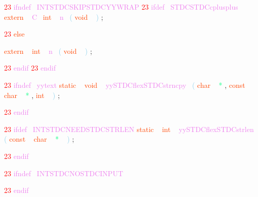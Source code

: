 \documentclass[8, usernames, dvipsnames]{beamer}
\begin{document}
\begin{frame}
 \textcolor{Red}{23}
\textcolor{Violet}{ifndef}\textcolor{White}{\ }
\textcolor{Violet}{INTSTDCSKIPSTDCYYWRAP}
  \textcolor{Red}{23}
\textcolor{Violet}{ifdef}\textcolor{White}{\ }
\textcolor{Violet}{STDCSTDCcplusplus}
 \textcolor{OrangeRed}{extern}
\textcolor{White}{\ }
\textcolor{Violet}{C}\textcolor{White}{\ }
\textcolor{OrangeRed}{int}
\textcolor{White}{\ }
\textcolor{Violet}{n}\textcolor{White}{\ }
\textcolor{SkyBlue}{(}
\textcolor{OrangeRed}{void}
\textcolor{White}{\ }
\textcolor{SkyBlue}{)}
\textcolor{Sepia}{;}

  \textcolor{Red}{23}
\textcolor{OrangeRed}{else}

 \textcolor{OrangeRed}{extern}
\textcolor{White}{\ }
\textcolor{OrangeRed}{int}
\textcolor{White}{\ }
\textcolor{Violet}{n}\textcolor{White}{\ }
\textcolor{SkyBlue}{(}
\textcolor{OrangeRed}{void}
\textcolor{White}{\ }
\textcolor{SkyBlue}{)}
\textcolor{Sepia}{;}

  \textcolor{Red}{23}
\textcolor{Violet}{endif}
  \textcolor{Red}{23}
\textcolor{Violet}{endif}
 
  \textcolor{Red}{23}
\textcolor{Violet}{ifndef}\textcolor{White}{\ }
\textcolor{Violet}{yytext}
 \textcolor{OrangeRed}{static}
\textcolor{White}{\ }
\textcolor{OrangeRed}{void}
\textcolor{White}{\ }
\textcolor{Violet}{yySTDCflexSTDCstrncpy}\textcolor{White}{\ }
\textcolor{SkyBlue}{(}
\textcolor{OrangeRed}{char}
\textcolor{White}{\ }
\textcolor{SpringGreen}{*}
\textcolor{Sepia}{,}
\textcolor{OrangeRed}{const}
\textcolor{White}{\ }
\textcolor{OrangeRed}{char}
\textcolor{White}{\ }
\textcolor{SpringGreen}{*}
\textcolor{Sepia}{,}
\textcolor{OrangeRed}{int}
\textcolor{White}{\ }
\textcolor{SkyBlue}{)}
\textcolor{Sepia}{;}

 \end{frame}
\begin{frame}
 \textcolor{Red}{23}
\textcolor{Violet}{endif}
 
  \textcolor{Red}{23}
\textcolor{Violet}{ifdef}\textcolor{White}{\ }
\textcolor{Violet}{INTSTDCNEEDSTDCSTRLEN}
 \textcolor{OrangeRed}{static}
\textcolor{White}{\ }
\textcolor{OrangeRed}{int}
\textcolor{White}{\ }
\textcolor{Violet}{yySTDCflexSTDCstrlen}\textcolor{White}{\ }
\textcolor{SkyBlue}{(}
\textcolor{OrangeRed}{const}
\textcolor{White}{\ }
\textcolor{OrangeRed}{char}
\textcolor{White}{\ }
\textcolor{SpringGreen}{*}
\textcolor{White}{\ }
\textcolor{SkyBlue}{)}
\textcolor{Sepia}{;}

  \textcolor{Red}{23}
\textcolor{Violet}{endif}
 
  \textcolor{Red}{23}
\textcolor{Violet}{ifndef}\textcolor{White}{\ }
\textcolor{Violet}{INTSTDCNOSTDCINPUT}
 
  \textcolor{Red}{23}
\textcolor{Violet}{endif}
 
 \end{frame}
\end{document}
